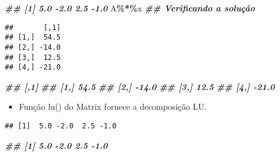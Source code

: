\documentclass[
]{article}
\newenvironment{Shaded}{\begin{snugshade}}{\end{snugshade}}
\newcommand{\DocumentationTok}[1]{\textcolor[rgb]{0.56,0.35,0.01}{\textbf{\textit{#1}}}}
\newcommand{\FunctionTok}[1]{\textcolor[rgb]{0.13,0.29,0.53}{\textbf{#1}}}
\newcommand{\NormalTok}[1]{#1}
\newcommand{\OtherTok}[1]{\textcolor[rgb]{0.56,0.35,0.01}{#1}}
\newcommand{\SpecialCharTok}[1]{\textcolor[rgb]{0.81,0.36,0.00}{\textbf{#1}}}
\providecommand{\tightlist}{%
  \setlength{\itemsep}{0pt}\setlength{\parskip}{0pt}}
\begin{document}
\begin{Shaded}
\begin{Highlighting}[]
\DocumentationTok{\#\# [1] 5.0 {-}2.0 2.5 {-}1.0}
\NormalTok{A}\SpecialCharTok{\%*\%}\NormalTok{x }\DocumentationTok{\#\# Verificando a solução}
\end{Highlighting}
\end{Shaded}

\begin{verbatim}
##       [,1]
## [1,]  54.5
## [2,] -14.0
## [3,]  12.5
## [4,] -21.0
\end{verbatim}

\begin{Shaded}
\begin{Highlighting}[]
\DocumentationTok{\#\# [,1]}
\DocumentationTok{\#\# [1,] 54.5}
\DocumentationTok{\#\# [2,] {-}14.0}
\DocumentationTok{\#\# [3,] 12.5}
\DocumentationTok{\#\# [4,] {-}21.0}
\end{Highlighting}
\end{Shaded}

\begin{itemize}
\tightlist
\item
  Função lu() do Matrix fornece a decomposição LU.
\end{itemize}

\begin{Shaded}
\end{Shaded}

\begin{verbatim}
## [1]  5.0 -2.0  2.5 -1.0
\end{verbatim}

\begin{Shaded}
\begin{Highlighting}[]
\DocumentationTok{\#\# [1] 5.0 {-}2.0 2.5 {-}1.0}
\end{Highlighting}
\end{Shaded}
\end{document}
